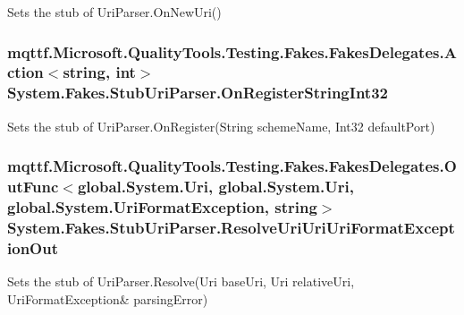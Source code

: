 Sets the stub of Uri\-Parser.\-On\-New\-Uri()

\hypertarget{class_system_1_1_fakes_1_1_stub_uri_parser_a86b0f5b75bbccd6ca48381450d90367b}{
\subsubsection[{On\-Register\-String\-Int32}]{\setlength{\rightskip}{0pt plus 5cm}mqttf.\-Microsoft.\-Quality\-Tools.\-Testing.\-Fakes.\-Fakes\-Delegates.\-Action$<$string, int$>$ System.\-Fakes.\-Stub\-Uri\-Parser.\-On\-Register\-String\-Int32}}\label{class_system_1_1_fakes_1_1_stub_uri_parser_a86b0f5b75bbccd6ca48381450d90367b}


Sets the stub of Uri\-Parser.\-On\-Register(\-String scheme\-Name, Int32 default\-Port)

\hypertarget{class_system_1_1_fakes_1_1_stub_uri_parser_a47c865b49787544d46f6d05b9781d477}{
\subsubsection[{Resolve\-Uri\-Uri\-Uri\-Format\-Exception\-Out}]{\setlength{\rightskip}{0pt plus 5cm}mqttf.\-Microsoft.\-Quality\-Tools.\-Testing.\-Fakes.\-Fakes\-Delegates.\-Out\-Func$<$global.\-System.\-Uri, global.\-System.\-Uri, global.\-System.\-Uri\-Format\-Exception, string$>$ System.\-Fakes.\-Stub\-Uri\-Parser.\-Resolve\-Uri\-Uri\-Uri\-Format\-Exception\-Out}}\label{class_system_1_1_fakes_1_1_stub_uri_parser_a47c865b49787544d46f6d05b9781d477}


Sets the stub of Uri\-Parser.\-Resolve(Uri base\-Uri, Uri relative\-Uri, Uri\-Format\-Exception\& parsing\-Error)




